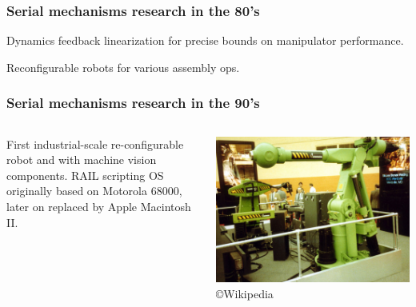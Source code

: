 \begin{frame}
	\frametitle{Serial mechanisms research in the 80's}
	\begin{tcolorbox}[coltitle=pink!70,colframe=gray!80!red,title=Feedback Linearization,toggle enlargement=evenpage]
		Dynamics feedback linearization for precise bounds on manipulator performance.
	\end{tcolorbox}
	
	\begin{tcolorbox}[title=Automatix,toggle enlargement=none]
		Reconfigurable robots for various assembly ops.
	\end{tcolorbox}
\end{frame}

\begin{frame}
\frametitle{Serial mechanisms research in the 90's}
%
\begin{columns}[b]
\begin{column}{.48\columnwidth}			
\begin{tcolorbox}[colframe=blue!80!green, coltitle=white!80,toggle enlargement=none]
First industrial-scale re-configurable robot and with machine vision components. RAIL scripting OS originally based on Motorola 68000, later on replaced by Apple Macintosh II. 
\end{tcolorbox}
\end{column}
\begin{column}{.52\columnwidth}
\includegraphics[width=\textwidth]{figures/Automatix.jpg}
\copyright Wikipedia
\end{column}
\end{columns}
\end{frame}

